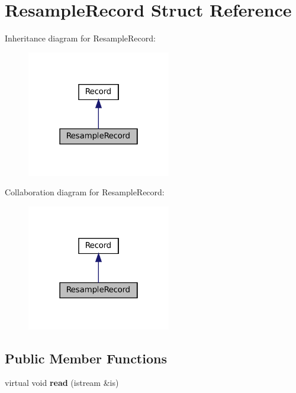 \hypertarget{structResampleRecord}{}\section{Resample\+Record Struct Reference}
\label{structResampleRecord}


Inheritance diagram for Resample\+Record\+:
\nopagebreak
\begin{figure}[H]
\begin{center}
\leavevmode
\includegraphics[width=178pt]{structResampleRecord__inherit__graph}
\end{center}
\end{figure}


Collaboration diagram for Resample\+Record\+:
\nopagebreak
\begin{figure}[H]
\begin{center}
\leavevmode
\includegraphics[width=178pt]{structResampleRecord__coll__graph}
\end{center}
\end{figure}
\subsection*{Public Member Functions}
\begin{DoxyCompactItemize}
\item 
\mbox{\label{structResampleRecord_aad71073b0c3bca805ca8e581c5939dd7}} 
virtual void {\bfseries read} (istream \&is)
\end{DoxyCompactItemize}
